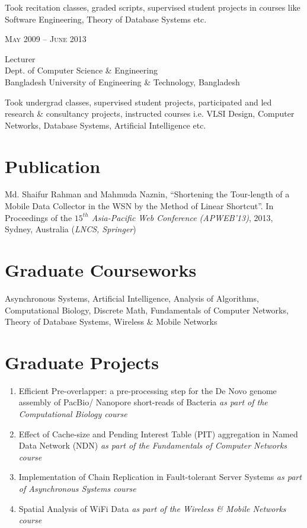\documentclass[10pt]{article} %
\begin{document}
\begin{minipage}[t]{0.5\textwidth}
\normalsize{Took recitation classes, graded scripts, supervised student
projects in courses like Software Engineering, Theory of Database Systems
etc.}

{\raggedleft\textsc{May 2009 -- June 2013}\par}

{\raggedright\large Lecturer\\
{Dept. of Computer Science \& Engineering \\ 
Bangladesh University of Engineering \& Technology, Bangladesh}\\[5pt]}

\normalsize{Took undergrad classes, supervised student projects, participated
and led research \& consultancy projects, instructed courses i.e. VLSI
Design, Computer Networks, Database Systems, Artificial Intelligence etc.}\\

\section{Publication}
 Md. Shaifur Rahman and Mahmuda Naznin, ``Shortening the Tour-length of a Mobile Data Collector
  in the WSN by the Method of Linear Shortcut''. In Proceedings of the
  \textit{$15^{th}$ Asia-Pacific Web Conference (APWEB'13)}, 2013, Sydney,
  Australia (\textit{LNCS, Springer})
  
 \section{Graduate Courseworks}
 Asynchronous Systems, Artificial Intelligence, Analysis of Algorithms,
Computational Biology, Discrete Math, Fundamentals of Computer Networks, 
Theory of Database Systems, Wireless \& Mobile Networks

\section{Graduate Projects} 
\begin{enumerate}
  \item Efficient Pre-overlapper: a pre-processing step for the De Novo
  genome assembly of PacBio/ Nanopore short-reads of Bacteria  
  \textit{as part of the Computational Biology course}
  \item Effect of Cache-size and Pending Interest Table (PIT) aggregation in
  Named Data Network (NDN) \textit{as part of the Fundamentals of Computer
  Networks course} 
  \item Implementation of Chain Replication in Fault-tolerant Server Systems
  \textit{as part of Asynchronous Systems course}
  \item Spatial Analysis of WiFi Data \textit{as part of the Wireless \& Mobile
  Networks course}
\end{enumerate}

\end{minipage} %
\end{document}
